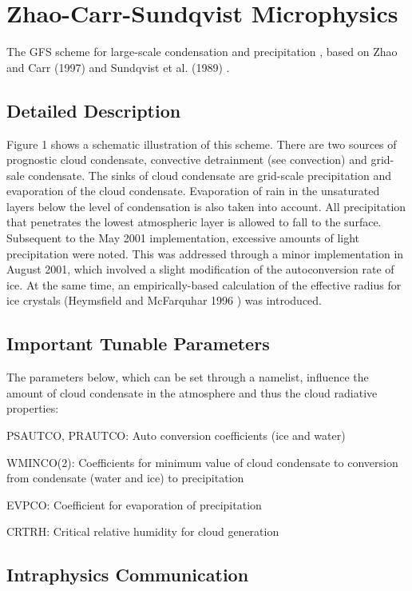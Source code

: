 \hypertarget{group___zhao-_carr}{}\section{Zhao-\/\+Carr-\/\+Sundqvist Microphysics}
\label{group___zhao-_carr}


The G\+FS scheme for large-\/scale condensation and precipitation , based on Zhao and Carr (1997) \cite{zhao_and_carr_1997} and Sundqvist et al. (1989) \cite{sundqvist_et_al_1989} .  




\subsection{Detailed Description}


Figure 1 shows a schematic illustration of this scheme. There are two sources of prognostic cloud condensate, convective detrainment (see convection) and grid-\/sale condensate. The sinks of cloud condensate are grid-\/scale precipitation and evaporation of the cloud condensate. Evaporation of rain in the unsaturated layers below the level of condensation is also taken into account. All precipitation that penetrates the lowest atmospheric layer is allowed to fall to the surface. Subsequent to the May 2001 implementation, excessive amounts of light precipitation were noted. This was addressed through a minor implementation in August 2001, which involved a slight modification of the autoconversion rate of ice. At the same time, an empirically-\/based calculation of the effective radius for ice crystals (Heymsfield and Mc\+Farquhar 1996 \cite{heymsfield_and_mcfarquhar_1996}) was introduced. \hypertarget{group___zhao-_carr_tune}{}\subsection{Important Tunable Parameters}\label{group___zhao-_carr_tune}
The parameters below, which can be set through a namelist, influence the amount of cloud condensate in the atmosphere and thus the cloud radiative properties\+:
\begin{DoxyItemize}
\item P\+S\+A\+U\+T\+CO, P\+R\+A\+U\+T\+CO\+: Auto conversion coefficients (ice and water)
\item W\+M\+I\+N\+C\+O(2)\+: Coefficients for minimum value of cloud condensate to conversion from condensate (water and ice) to precipitation
\item E\+V\+P\+CO\+: Coefficient for evaporation of precipitation
\item C\+R\+T\+RH\+: Critical relative humidity for cloud generation
\end{DoxyItemize}\hypertarget{group___zhao-_carr_intramps}{}\subsection{Intraphysics Communication}\label{group___zhao-_carr_intramps}

